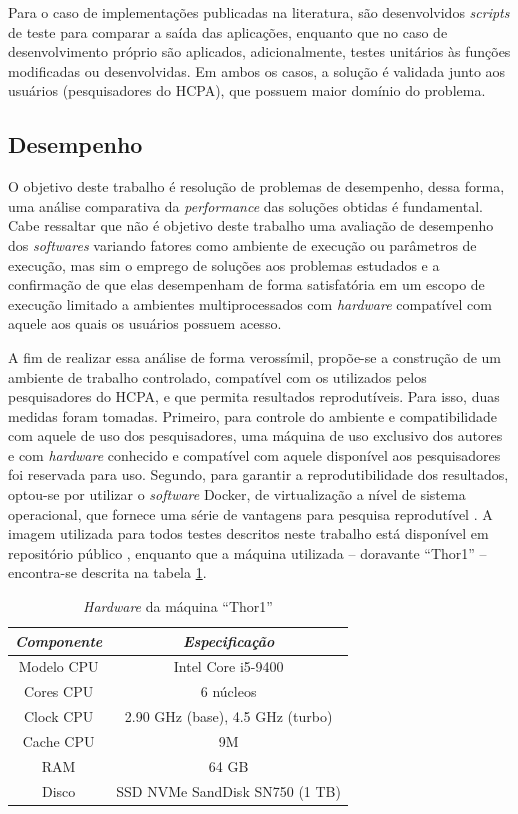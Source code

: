 \documentclass[cic,tc]{iiufrgs}
\begin{document}
Para o caso de implementações publicadas na literatura, são desenvolvidos
\textit{scripts} de teste para comparar a saída das aplicações, enquanto que no
caso de desenvolvimento próprio são aplicados, adicionalmente, testes unitários
às funções modificadas ou desenvolvidas. Em ambos os casos, a solução é
validada junto aos usuários (pesquisadores do HCPA), que possuem maior domínio
do problema.

\subsection{Desempenho}

O objetivo deste trabalho é resolução de problemas de desempenho, dessa forma,
uma análise comparativa da \textit{performance} das soluções obtidas é
fundamental. Cabe ressaltar que não é objetivo deste trabalho uma avaliação de
desempenho dos \textit{softwares} variando fatores como ambiente de execução ou
parâmetros de execução, mas sim o emprego de soluções aos problemas estudados e
a confirmação de que elas desempenham de forma satisfatória em um escopo de
execução limitado a ambientes multiprocessados com \textit{hardware} compatível com
aquele aos quais os usuários possuem acesso.

A fim de realizar essa análise de forma verossímil, propõe-se a construção de
um ambiente de trabalho controlado, compatível com os utilizados pelos
pesquisadores do HCPA, e que permita resultados reprodutíveis. Para isso, duas
medidas foram tomadas. Primeiro, para controle do ambiente e compatibilidade
com aquele de uso dos pesquisadores, uma máquina de uso exclusivo dos autores e
com \textit{hardware} conhecido e compatível com aquele disponível aos
pesquisadores foi reservada para uso. Segundo, para garantir a
reprodutibilidade dos resultados, optou-se por utilizar o \textit{software}
Docker, de virtualização a nível de sistema operacional, que fornece uma série
de vantagens para pesquisa reprodutível \cite{boettiger2015introduction}. A
imagem utilizada para todos testes descritos neste trabalho está disponível em
repositório público \cite{dockerme}, enquanto que a máquina utilizada --
doravante ``Thor1'' -- encontra-se descrita na tabela \ref{tbl:thor1}.

\begin{table}[h]
    \caption{\textit{Hardware} da máquina ``Thor1''}
    \centering
        \begin{tabular}{c|c}
          \hline
          \textit{Componente}  &   \textit{Especificação} \\
          \hline
          \hline
          Modelo CPU & Intel Core i5-9400 \\
          Cores CPU & 6 núcleos\\
          Clock CPU & 2.90 GHz (base), 4.5 GHz (turbo) \\
          Cache CPU & 9M \\
          RAM & 64 GB \\
          Disco & SSD NVMe SandDisk SN750 (1 TB) \\
          \hline
        \end{tabular}
    \label{tbl:thor1}
\end{table}
\end{document}
